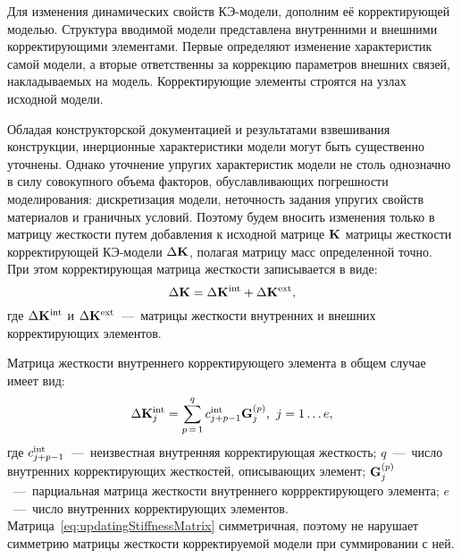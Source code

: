 Для изменения динамических свойств КЭ-модели, дополним её корректирующей моделью. Структура вводимой модели представлена внутренними и внешними корректирующими элементами. Первые определяют изменение характеристик самой модели, а вторые ответственны за коррекцию параметров внешних связей, накладываемых на модель. Корректирующие элементы строятся на узлах исходной модели. 

Обладая конструкторской документацией и результатами взвешивания конструкции, инерционные характеристики модели могут быть существенно уточнены. Однако уточнение упругих характеристик модели не столь однозначно в силу совокупного объема факторов, обуславливающих погрешности моделирования: дискретизация модели, неточность задания упругих свойств материалов и граничных условий. Поэтому будем вносить изменения только в матрицу жесткости путем добавления к исходной матрице $ \mathbf{K} $ матрицы жесткости корректирующей КЭ-модели $ \Delta \mathbf{K} $, полагая матрицу масс определенной точно. При этом корректирующая матрица жесткости записывается в виде:
\begin{equation}
	\Delta \mathbf{K} = \Delta \mathbf{K} ^ {\text{int}} + \Delta \mathbf{K} ^ {\text{ext}}, \label{eq:stiffMatrixDecomposition}
\end{equation}
где $ \Delta \mathbf{K} ^ {\text{int}} $ и $ \Delta \mathbf{K} ^ {\text{ext}} $~---~матрицы жесткости внутренних и внешних корректирующих элементов.

Матрица жесткости внутреннего корректирующего элемента в общем случае имеет вид:
\begin{equation}
	\Delta \mathbf{K} ^ {\text{int}}_j = \sum\limits_{p\,=\,1}^{q} c ^ {\text{int}}_{j+p-1} \mathbf{G}_j^{(p)}, \ j = 1 \hdots e, \label{eq:updatingStiffnessMatrix}
\end{equation}
где $ c ^ {\text{int}}_{j+p-1} $~---~неизвестная внутренняя корректирующая жесткость; $ q $~---~число внутренних корректирующих жесткостей, описывающих элемент; $ \mathbf{G}_j^{(p)} $~---~парциальная матрица жесткости внутреннего коррректирующего элемента; $ e $~---~число внутренних корректирующих элементов. Матрица~\eqref{eq:updatingStiffnessMatrix} симметричная, поэтому не нарушает симметрию матрицы жесткости корректируемой модели при суммировании с ней.

